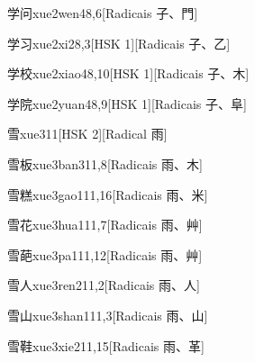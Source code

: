 \begin{entry}{学问}{xue2wen4}{8,6}[Radicais ⼦、⾨]
\end{entry}

\begin{entry}{学习}{xue2xi2}{8,3}[HSK 1][Radicais ⼦、⼄]
\end{entry}

\begin{entry}{学校}{xue2xiao4}{8,10}[HSK 1][Radicais ⼦、⽊]
\end{entry}

\begin{entry}{学院}{xue2yuan4}{8,9}[HSK 1][Radicais ⼦、⾩]
\end{entry}

\begin{entry}{雪}{xue3}{11}[HSK 2][Radical ⾬]
\end{entry}

\begin{entry}{雪板}{xue3ban3}{11,8}[Radicais ⾬、⽊]
\end{entry}

\begin{entry}{雪糕}{xue3gao1}{11,16}[Radicais ⾬、⽶]
\end{entry}

\begin{entry}{雪花}{xue3hua1}{11,7}[Radicais ⾬、⾋]
\end{entry}

\begin{entry}{雪葩}{xue3pa1}{11,12}[Radicais ⾬、⾋]
\end{entry}

\begin{entry}{雪人}{xue3ren2}{11,2}[Radicais ⾬、⼈]
\end{entry}

\begin{entry}{雪山}{xue3shan1}{11,3}[Radicais ⾬、⼭]
\end{entry}

\begin{entry}{雪鞋}{xue3xie2}{11,15}[Radicais ⾬、⾰]
\end{entry}

